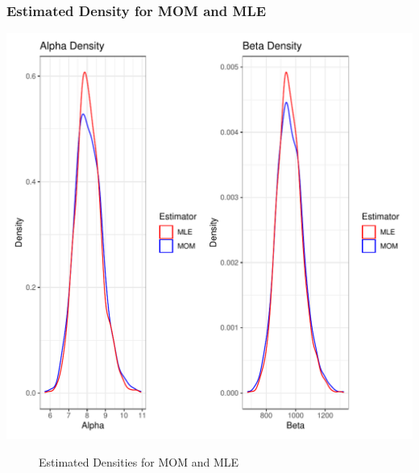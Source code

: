 \documentclass{article}\usepackage[]{graphicx}\usepackage[]{xcolor}
\makeatletter
\def\maxwidth{ %
  \ifdim\Gin@nat@width>\linewidth
    \linewidth
  \else
    \Gin@nat@width
  \fi
}
\newenvironment{knitrout}{}{} %
\makeatother
\begin{document}
\pagebreak
\subsubsection{Estimated Density for MOM and MLE}
\begin{knitrout}\scriptsize
{}\color{fgcolor}
\includegraphics[width=\maxwidth]{figure/plot6-1} 
\end{knitrout}
\begin{figure}[H]
\begin{center}

\caption{Estimated Densities for MOM and MLE}
\label{densitycomparison} %
\end{center}
\end{figure}
\end{document}
